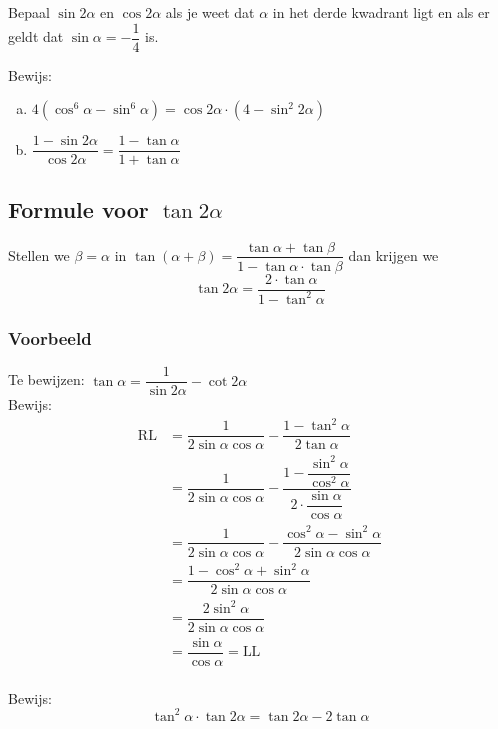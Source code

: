 \documentclass[a4paper,12pt]{article}
\begin{document}
\begin{oefening}
Bepaal $\sin 2\alpha$ en $\cos 2\alpha$ als je weet dat $\alpha$ in het derde kwadrant ligt en als er geldt dat $\sin\alpha=-\dfrac{1}{4}$ is.
\end{oefening}

\begin{oefening}
Bewijs:
\begin{enumerate}[(a)]
  \itemsep1em
  \item $4(\cos^6\alpha-\sin^6\alpha)=\cos 2\alpha \cdot(4 - \sin^2 2\alpha)$
  \item $\dfrac{1-\sin 2\alpha}{\cos 2\alpha}=\dfrac{1-\tan\alpha}{1+\tan\alpha}$
\end{enumerate}
\end{oefening}

\subsection{Formule voor $\tan 2\alpha$}

Stellen we $\beta=\alpha$ in $\tan(\alpha + \beta)=\dfrac{\tan\alpha + \tan\beta}{1-\tan\alpha\cdot\tan\beta}$ dan krijgen we
$$\tan 2\alpha = \dfrac{2\cdot \tan\alpha}{1-\tan^2\alpha}$$

\subsubsection*{Voorbeeld}

Te bewijzen: $\tan\alpha = \dfrac{1}{\sin 2\alpha} - \cot 2\alpha$\\
Bewijs:
\begin{align*}
  \mbox{RL} &= \dfrac{1}{2\sin\alpha \cos\alpha}-\dfrac{1-\tan^2\alpha}{2\tan\alpha}\\
            &= \dfrac{1}{2\sin\alpha \cos\alpha}-\dfrac{1-\dfrac{\sin^2\alpha}{\cos^2\alpha}}{2\cdot \dfrac{\sin\alpha}{\cos\alpha}}\\
            &= \dfrac{1}{2\sin\alpha \cos\alpha}-\dfrac{\cos^2\alpha - \sin^2\alpha}{2\sin\alpha\cos\alpha}\\
            &= \dfrac{1 - \cos^2\alpha + \sin^2\alpha}{2\sin\alpha \cos\alpha}\\
            &= \dfrac{2\sin^2\alpha}{2\sin\alpha \cos\alpha}\\
            &= \dfrac{\sin\alpha}{\cos\alpha} = \mbox{LL}\\
\end{align*}

\begin{oefening}
Bewijs:
$$\tan^2\alpha\cdot\tan 2\alpha=\tan 2\alpha - 2\tan\alpha$$
\end{oefening}
\end{document}
